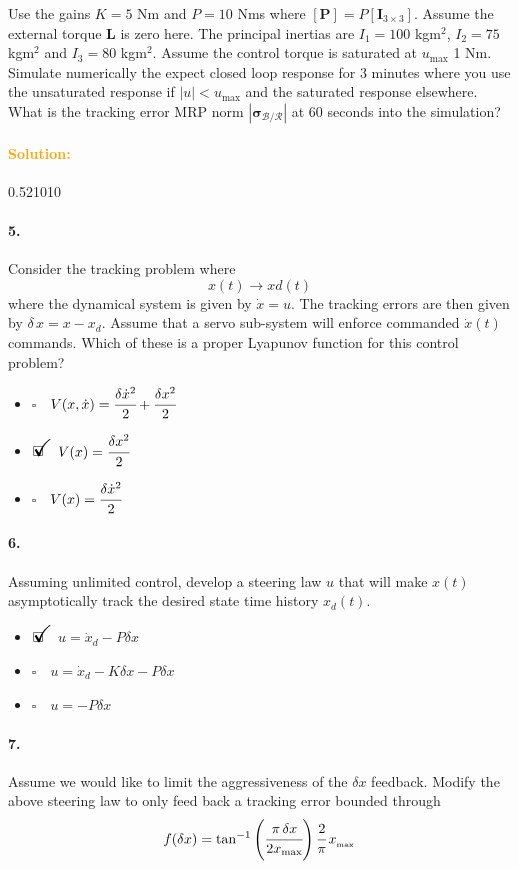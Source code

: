 \documentclass[12pt, a4paper]{article}
\newcommand{\ans}{\item[]$\rlap{\LARGE{\checkmark}}\square\quad$}
\newcommand{\noans}{\item[]$\square\quad$}
\begin{document}
Use the gains $K=5$ Nm and $P = 10$ Nms where $[\bm{P}] = P[\bm{I}_{3\times3}]$. Assume the external torque $\bm{L}$ is zero here. The principal inertias are $I_{1} = 100$ kgm$^{2}$, $I_{2} = 75$ kgm$^{2}$ and $I_{3} = 80$ kgm$^{2}$. Assume the control torque is saturated at $u_{\text{max}}$ 1 Nm. Simulate numerically the expect closed loop response for 3 minutes where you use the unsaturated response if $|u|<u_{\text{max}}$
and the saturated response elsewhere. What is the tracking error MRP norm $|\bm{\sigma}_{\mathcal{B}/\mathcal{R}}|$ at 60 seconds into the simulation?

\paragraph{\textcolor{orange}{Solution:}}0.521010

\paragraph{5.}
Consider the tracking problem where 
$$x(t)\rightarrow xd(t)$$ where the dynamical system is given by $\dot{x} = u$.  The tracking errors are then given by $\delta\, x = x - x_{d}$.  Assume that a servo sub-system will enforce commanded $\dot{x}(t)$ commands. Which of these is a proper Lyapunov function for this control problem?

\begin{itemize}
\noans $V(x,\dot{x}) = \cfrac{\delta \dot{x}^{2}}{2} + \cfrac{\delta x^{2}}{2}$
\ans $V(x) = \cfrac{\delta x^{2}}{2}$
\noans $V(x) = \cfrac{\delta \dot{x}^{2}}{2}$
\end{itemize}

\paragraph{6.}
Assuming unlimited control, develop a steering law $u$ that will make $x(t)$ asymptotically track the desired state time history $x_{d}(t)$.

\begin{itemize}
\ans $u = \dot{x}_{d}-P \delta x$
\noans $u = \dot{x}_{d}- K\delta x -P \delta x$
\noans $u = -P \delta x$
\end{itemize}

\paragraph{7.}
Assume we would like to limit the aggressiveness of the $\delta x$ feedback. Modify the above steering law to only feed back a tracking error bounded through
$$
f(\delta x) = \tan^{-1}\left( \cfrac{\pi\, \delta x}{2 x_{\text{max}}} \right)\cfrac{2}{\pi}\,x_{_{\text{max}}}
$$
\end{document}
